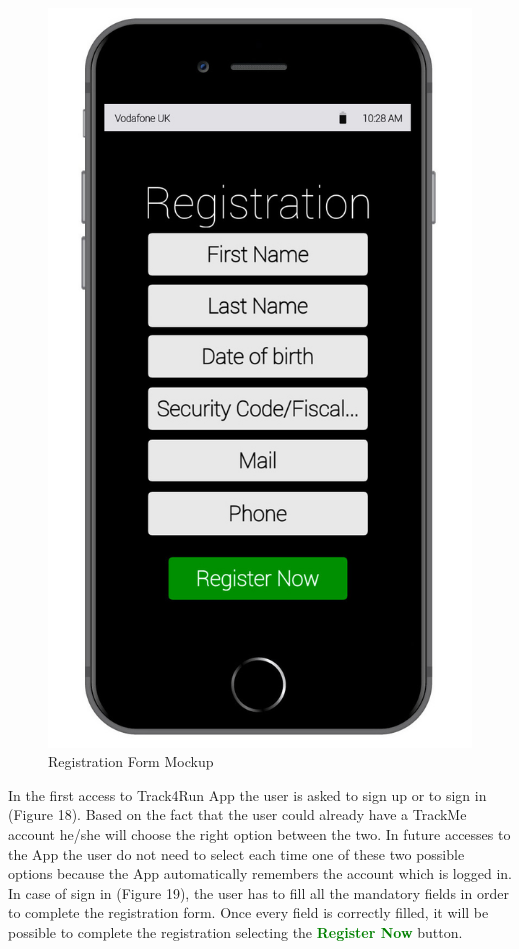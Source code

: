 \begin{enumerate}
\begin{figure}[H]
\begin{center}
\begin{minipage}[c]{.40\textwidth}
          \includegraphics[height=14 cm]{Images/Mockups/Track4RunMockup4.jpg}
	\caption{Registration Form Mockup}
        \end{minipage}
      \end{center}
\end{figure}
In the first access to Track4Run App the user is asked to sign up or to sign in 			(Figure 18). Based on the fact that the user could already have a TrackMe account he/she will choose the right option between the two. In future accesses to the App the user do not need to select each time one of these two possible options because the App automatically remembers the account which is logged in. In case of sign in (Figure 19), the user has to fill all the mandatory fields in order to complete the registration form. Once every field is correctly filled, it will be possible to complete the registration selecting the {\textcolor{Green}{\textbf{Register Now}}} button. 
\clearpage
\begin{figure}[H]
\begin{center}
        \begin{minipage}[c]{.40\textwidth}
        \centering

\end{minipage}
\end{center}
\end{figure}
\end{enumerate}
